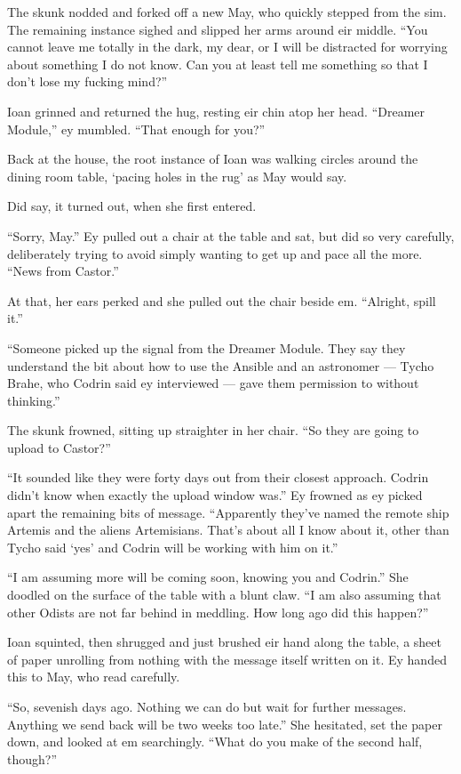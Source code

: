 The skunk nodded and forked off a new May, who quickly stepped from the sim. The remaining instance sighed and slipped her arms around eir middle. ``You cannot leave me totally in the dark, my dear, or I will be distracted for worrying about something I do not know. Can you at least tell me something so that I don't lose my fucking mind?''

Ioan grinned and returned the hug, resting eir chin atop her head. ``Dreamer Module,'' ey mumbled. ``That enough for you?''

Back at the house, the root instance of Ioan was walking circles around the dining room table, `pacing holes in the rug' as May would say.

Did say, it turned out, when she first entered.

``Sorry, May.'' Ey pulled out a chair at the table and sat, but did so very carefully, deliberately trying to avoid simply wanting to get up and pace all the more. ``News from Castor.''

At that, her ears perked and she pulled out the chair beside em. ``Alright, spill it.''

``Someone picked up the signal from the Dreamer Module. They say they understand the bit about how to use the Ansible and an astronomer — Tycho Brahe, who Codrin said ey interviewed — gave them permission to without thinking.''

The skunk frowned, sitting up straighter in her chair. ``So they are going to upload to Castor?''

``It sounded like they were forty days out from their closest approach. Codrin didn't know when exactly the upload window was.'' Ey frowned as ey picked apart the remaining bits of message. ``Apparently they've named the remote ship Artemis and the aliens Artemisians. That's about all I know about it, other than Tycho said `yes' and Codrin will be working with him on it.''

``I am assuming more will be coming soon, knowing you and Codrin.'' She doodled on the surface of the table with a blunt claw. ``I am also assuming that other Odists are not far behind in meddling. How long ago did this happen?''

Ioan squinted, then shrugged and just brushed eir hand along the table, a sheet of paper unrolling from nothing with the message itself written on it. Ey handed this to May, who read carefully.

``So, sevenish days ago. Nothing we can do but wait for further messages. Anything we send back will be two weeks too late.'' She hesitated, set the paper down, and looked at em searchingly. ``What do you make of the second half, though?''

